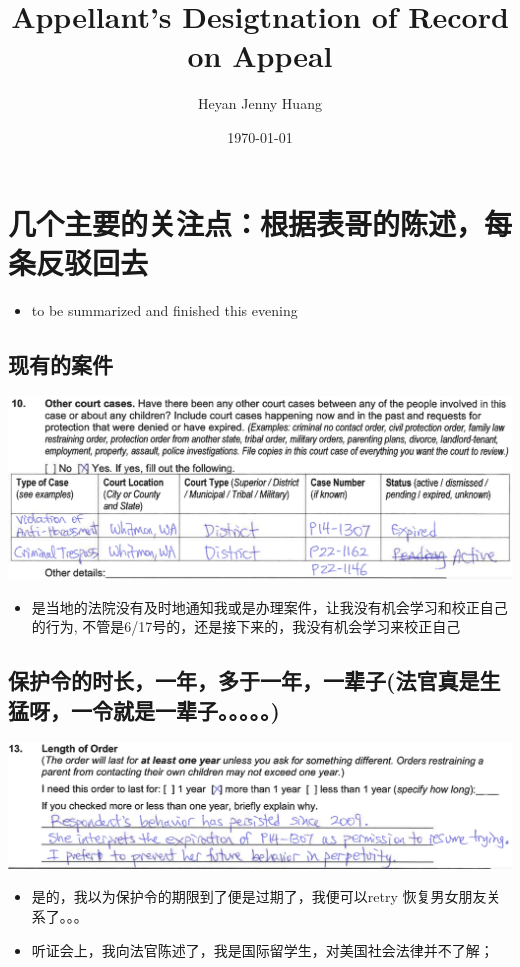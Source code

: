 \documentclass[9pt, b5paaper]{book}
\author{Heyan Jenny Huang}
\date{\today}
\title{Appellant's Desigtnation of Record on Appeal}
\begin{document}
\maketitle
\tableofcontents


\chapter{几个主要的关注点：根据表哥的陈述，每条反驳回去}
\label{sec-1}
\begin{itemize}
\item to be summarized and finished this evening
\end{itemize}
\section{现有的案件}
\label{sec-1-1}

\includegraphics[width=.9\linewidth]{./pic/dearCousin_20220919_153339.png}
\begin{itemize}
\item 是当地的法院没有及时地通知我或是办理案件，让我没有机会学习和校正自己的行为, 不管是6/17号的，还是接下来的，我没有机会学习来校正自己
\end{itemize}
\section{保护令的时长，一年，多于一年，一辈子(法官真是生猛呀，一令就是一辈子。。。。。)}
\label{sec-1-2}

\includegraphics[width=.9\linewidth]{./pic/dearCousin_20220919_153711.png}
\begin{itemize}
\item 是的，我以为保护令的期限到了便是过期了，我便可以retry 恢复男女朋友关系了。。。
\item 听证会上，我向法官陈述了，我是国际留学生，对美国社会法律并不了解；
\end{itemize}
\end{document}
